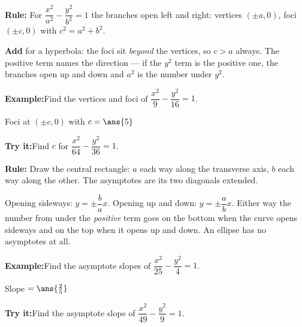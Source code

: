 \documentclass[12pt]{article}
\begin{document}
\begin{formulabox}
\textbf{Rule:} For $\dfrac{x^2}{a^2} - \dfrac{y^2}{b^2} = 1$ the branches open
left and right: vertices $(\pm a, 0)$, foci $(\pm c, 0)$ with
$c^2 = a^2 + b^2$.\par
\textbf{Add} for a hyperbola: the foci sit \emph{beyond} the vertices, so
$c > a$ always. The positive term names the direction --- if the $y^2$ term is
the positive one, the branches open up and down and $a^2$ is the number
under $y^2$.
\end{formulabox}
\begin{examplebox}
\textbf{Example:}\quad Find the vertices and foci of
$\dfrac{x^2}{9} - \dfrac{y^2}{16} = 1$.

Foci at $(\pm c, 0)$ with $c = \ans{5}$
\end{examplebox}
\begin{tryitbox}
\textbf{Try it:}\quad Find $c$ for $\dfrac{x^2}{64} - \dfrac{y^2}{36} = 1$.\\[2pt]
\end{tryitbox}

\begin{formulabox}
\textbf{Rule:} Draw the central rectangle: $a$ each way along the transverse
axis, $b$ each way along the other. The asymptotes are its two diagonals
extended.\par
Opening sideways: $y = \pm \dfrac{b}{a}x$. Opening up and down:
$y = \pm \dfrac{a}{b}x$. Either way the number from under the \emph{positive}
term goes on the bottom when the curve opens sideways and on the top when it
opens up and down. An ellipse has no asymptotes at all.
\end{formulabox}
\begin{examplebox}
\textbf{Example:}\quad Find the asymptote slopes of
$\dfrac{x^2}{25} - \dfrac{y^2}{4} = 1$.

Slope $= \ans{\frac{2}{5}}$
\end{examplebox}
\begin{tryitbox}
\textbf{Try it:}\quad Find the asymptote slope of
$\dfrac{x^2}{49} - \dfrac{y^2}{9} = 1$.\\[2pt]
\end{tryitbox}
\end{document}
